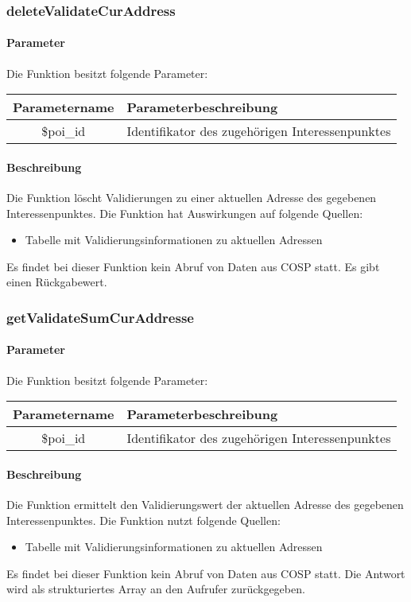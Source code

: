 \subsubsection{deleteValidateCurAddress}
\paragraph{Parameter} Die Funktion besitzt folgende Parameter:
\begin{table}[H]
	\begin{tabular}{|c|p{11cm}|}
		\hline
		\textbf{Parametername} & \textbf{Parameterbeschreibung} \\ \hline
		\$poi\_id & Identifikator des zugehörigen Interessenpunktes \\ \hline
	\end{tabular}
\end{table}
\paragraph{Beschreibung} Die Funktion löscht Validierungen zu einer aktuellen Adresse des gegebenen Interessenpunktes. Die Funktion hat Auswirkungen auf folgende Quellen:
\begin{itemize}
	\item Tabelle mit Validierungsinformationen zu aktuellen Adressen
\end{itemize}
Es findet bei dieser Funktion kein Abruf von Daten aus {\glqq COSP\grqq} statt. Es gibt einen Rückgabewert.
\subsubsection{getValidateSumCurAddresse}
\paragraph{Parameter} Die Funktion besitzt folgende Parameter:
\begin{table}[H]
	\begin{tabular}{|c|p{11cm}|}
		\hline
		\textbf{Parametername} & \textbf{Parameterbeschreibung} \\ \hline
		\$poi\_id & Identifikator des zugehörigen Interessenpunktes \\ \hline
	\end{tabular}
\end{table}
\paragraph{Beschreibung} Die Funktion ermittelt den Validierungswert der aktuellen Adresse des gegebenen Interessenpunktes. Die Funktion nutzt folgende Quellen:
\begin{itemize}
	\item Tabelle mit Validierungsinformationen zu aktuellen Adressen
\end{itemize}
Es findet bei dieser Funktion kein Abruf von Daten aus {\glqq COSP\grqq} statt. Die Antwort wird als strukturiertes Array an den Aufrufer zurückgegeben.
